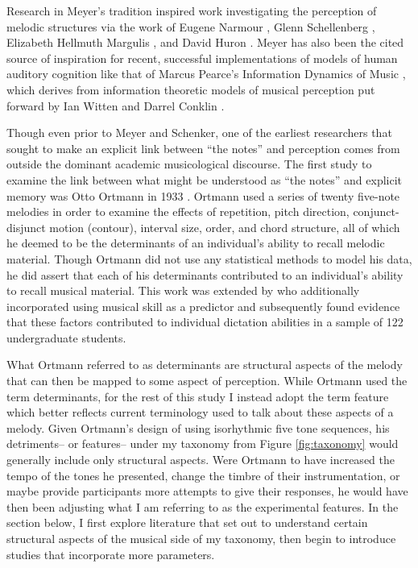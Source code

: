 \documentclass[12pt,]{book}
\begin{document}
Research in Meyer's tradition inspired work investigating the perception of melodic structures via the work of Eugene Narmour \citep{narmourAnalysisCognitionBasic1990, narmourAnalysisCognitionMelodic1992}, Glenn Schellenberg \citep{schellenbergSimplifyingImplicationRealizationModel1997}, Elizabeth Hellmuth Margulis \citep{margulisModelMelodicExpectation2005}, and David Huron \citep{huronSweetAnticipation2006}.
Meyer has also been the cited source of inspiration for recent, successful implementations of models of human auditory cognition like that of Marcus Pearce's Information Dynamics of Music \citep{pearceConstructionEvaluationStatistical2005, pearceStatisticalLearningProbabilistic2018a}, which derives from information theoretic models of musical perception put forward by Ian Witten and Darrel Conklin \citep{conklinMultipleViewpointSystems1995}.

Though even prior to Meyer and Schenker, one of the earliest researchers that sought to make an explicit link between ``the notes'' and perception comes from outside the dominant academic musicological discourse.
The first study to examine the link between what might be understood as ``the notes'' and explicit memory was Otto Ortmann in 1933 \citep{ortmannTonalDeterminantsMelodic1933}.
Ortmann used a series of twenty five-note melodies in order to examine the effects of repetition, pitch direction, conjunct-disjunct motion (contour), interval size, order, and chord structure, all of which he deemed to be the determinants of an individual's ability to recall melodic material.
Though Ortmann did not use any statistical methods to model his data, he did assert that each of his determinants contributed to an individual's ability to recall musical material.
This work was extended by \citet{taylorStrategiesMemoryShort1983} who additionally incorporated using musical skill as a predictor and subsequently found evidence that these factors contributed to individual dictation abilities in a sample of 122 undergraduate students.

What Ortmann referred to as determinants are structural aspects of the melody that can then be mapped to some aspect of perception.
While Ortmann used the term determinants, for the rest of this study I instead adopt the term feature which better reflects current terminology used to talk about these aspects of a melody.
Given Ortmann's design of using isorhythmic five tone sequences, his detriments-- or features-- under my taxonomy from Figure \ref{fig:taxonomy} would generally include only structural aspects.
Were Ortmann to have increased the tempo of the tones he presented, change the timbre of their instrumentation, or maybe provide participants more attempts to give their responses, he would have then been adjusting what I am referring to as the experimental features.
In the section below, I first explore literature that set out to understand certain structural aspects of the musical side of my taxonomy, then begin to introduce studies that incorporate more parameters.
\end{document}
